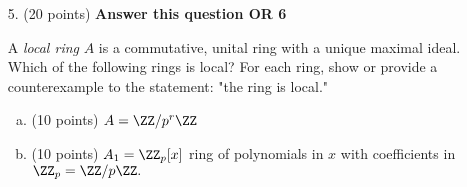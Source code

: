 \documentclass{article}
\begin{document}
\begin{itemize}
\begin{enumerate}[(a)]
\begin{proof}
					Thus, $n=4$ is the smallest integer that satisfies $x^n-1\in I,$ and we know this is true because $x^4-1\equiv1-1=0$ in $\ZZ_5.$ Thus, the order of $\overline x$ is 
				\end{proof}

			\item (5 points) Find, if exists, a coset of order 3 in $F^\times.$
				\begin{soln}
					Let $f\in \ZZ_5[x]$ such that $\deg f\le 1.$ Then suppose the coset $f+I$ has order 3, then 
					\[(f+I)^3=f^3+I=1+I\implies f^3-1\in I\]
					We can simplify by assuming $\deg f\le 1,$ so $f=ax+b,$ and 
					\begin{align*}
						(ax+b)^3-1 &= (ax+b-1)\left[ (ax+b)^2+(ax+b)+1 \right] \in I
					\end{align*}
					If this is in $I,$ then $x^2+2x+3$ divides this product, and since $s^2+2x+3$ is irreducible in $\ZZ_5[x],$ it must divide the quadratic part:
					\[q(x^2+2x+3) = (ax+b)^2+(ax+b)+1 = a^2x^2 + (2ab+a)x + (b^2+b+1)\]
					The only possibility is $q=a^2,$ so 
					\[a^2(x^2+2x+3)=a^2+2a^2x+3a^2 = a^2x^2 + (2ab+a)x + (b^2+b+1)\]
					and equating coefficients, we have
					\begin{align*}
						2a^2 &= 2ab+a \\
						3a^2 &= b^2+b+1
					\end{align*}
					Since $\ZZ_5$ is an integral domain, the first equation implies that $2a=2b+1,$ which is impossible. Thus, there are no solutions for $a$ and $b,$ so no such $f$ exists, and there is no coset of order 3 in $F^\times.$
				\end{soln}
				
		\end{enumerate}

		\newpage

	\item[5.] (20 points) \textbf{Answer this question OR 6}

		A \textit{local ring} $A$ is a commutative, unital ring with a unique maximal ideal. Which of the following rings is local? For each ring, show or provide a counterexample to the statement: "the ring is local."
		\begin{enumerate}[(a)]
			\item (10 points) $A=\ZZ/p^r\ZZ$

			\item (10 points) $A_1=\ZZ_p[x]$ ring of polynomials in $x$ with coefficients in $\ZZ_p=\ZZ/p\ZZ.$
				

\end{enumerate}
\end{itemize}
\end{document}

